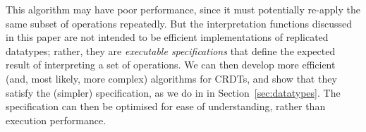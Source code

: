 This algorithm may have poor performance, since it must potentially re-apply the same subset of operations repeatedly.
But the interpretation functions discussed in this paper are not intended to be efficient implementations of replicated datatypes; rather, they are \emph{executable specifications} that define the expected result of interpreting a set of operations.
We can then develop more efficient (and, most likely, more complex) algorithms for CRDTs, and show that they satisfy the (simpler) specification, as we do in in Section~\ref{sec:datatypes}.
The specification can then be optimised for ease of understanding, rather than execution performance.
